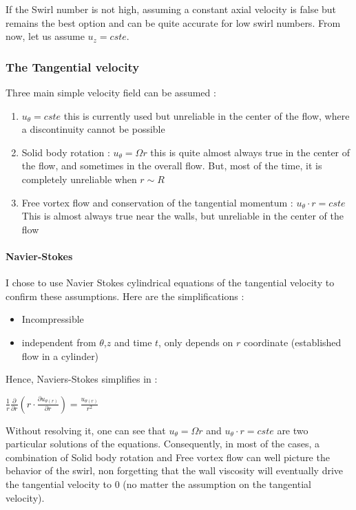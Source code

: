 If the Swirl number is not high, assuming a constant axial velocity is false but remains the best option and can be quite accurate for low swirl numbers. From now, let us assume $u_{z}=cste$.

\subsubsection{The Tangential velocity}

Three main simple velocity field can be assumed :
\begin{enumerate}
\item $u_{\theta}=cste$ this is currently used but unreliable in the center of the flow, where a discontinuity cannot be possible
\item Solid body rotation : $u_{\theta}=\Omega r$ this is quite almost always true in the center of the flow, and sometimes in the overall flow. But, most of the time, it is completely unreliable when $r \sim R$ 
\item Free vortex flow and conservation of the tangential momentum : $u_{\theta} \cdot r=cste$ This is almost always true near the walls, but unreliable in the center of the flow
\end{enumerate}

\paragraph{Navier-Stokes} I chose to use Navier Stokes cylindrical equations of the tangential velocity to confirm these assumptions. Here are the simplifications :
\begin{itemize}
\item Incompressible
\item independent from $\theta$,$z$ and time $t$, only depends on $r$ coordinate (established flow in a cylinder)
\end{itemize}
Hence, Naviers-Stokes simplifies in :

$\frac{1}{r}\frac{\partial }{\partial r}(r \cdot \frac{\partial u_{\theta(r)}}{\partial r})=\frac{u_{\theta(r)}}{r^2}$ 

Without resolving it, one can see that $u_{\theta}=\Omega r$ and $u_{\theta} \cdot r=cste$ are two particular solutions of the equations. Consequently, in most of the cases, a combination of Solid body rotation and Free vortex flow can well picture the behavior of the swirl, non forgetting that the wall viscosity will eventually drive the tangential velocity to 0 (no matter the assumption on the tangential velocity).

